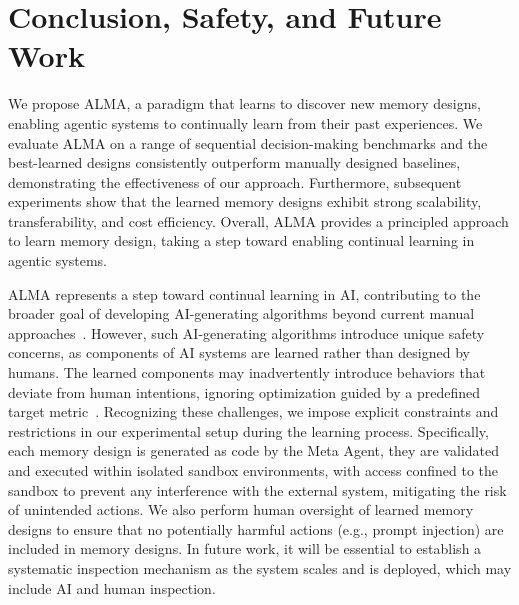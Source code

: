 \documentclass{article}
\theoremstyle{plain}
\theoremstyle{definition}
\theoremstyle{remark}
\newcommand{\ouralgo}{ALMA\xspace} %
\begin{document}
\section{Conclusion, Safety, and Future Work}
We propose \ouralgo, a paradigm that learns to discover new memory designs, enabling agentic systems to continually learn from their past experiences. We evaluate \ouralgo on a range of sequential decision-making benchmarks and the best-learned designs consistently outperform manually designed baselines, demonstrating the effectiveness of our approach. Furthermore, subsequent experiments show that the learned memory designs exhibit strong scalability, transferability, and cost efficiency. Overall, \ouralgo provides a principled approach to learn memory design, taking a step toward enabling continual learning in agentic systems.


\ouralgo represents a step toward continual learning in AI, contributing to the broader goal of developing AI-generating algorithms beyond current manual approaches~\citep{clune2019ai}. However, such AI-generating algorithms introduce unique safety concerns, as components of AI systems are learned rather than designed by humans. The learned components may inadvertently introduce behaviors that deviate from human intentions, ignoring optimization guided by a predefined target metric~\citep{Bostrom2020EthicalAI, Md2020SourceFinder, Ecoffet2020Open}. 
Recognizing these challenges, we impose explicit constraints and restrictions in our experimental setup during the learning process. 
Specifically, each memory design is generated as code by the Meta Agent, they are validated and executed within isolated sandbox environments, with access confined to the sandbox to prevent any interference with the external system, mitigating the risk of unintended actions. We also perform human oversight of learned memory designs to ensure that no potentially harmful actions (e.g., prompt injection) are included in memory designs. In future work, it will be essential to establish a systematic inspection mechanism as the system scales and is deployed, which may include AI and human inspection.
\end{document}
